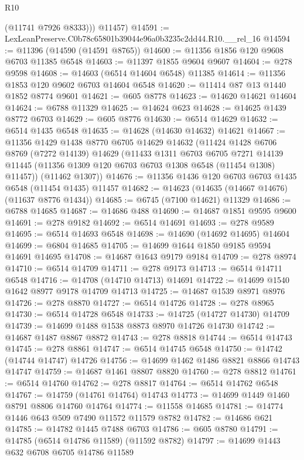 \begin{lexlean}{R10}
\begin{coremodule}
          (@11741 @7926 @8333)))
      @11457)
@14591 := LexLeanPreserve.C0b78c65801b39044e96a0b3235c2dd44.R10.__rel_16
@14594 := @11396 (@14590 (@14591 @8765))
@14600 := @11356 @1856 @120 @9608 @6703 @11385 @6548
@14603 := @11397 @1855 @9604 @9607
@14604 := @278 @9598
@14608 := @14603 (@6514 @14604 @6548) @11385
@14614 := @11356 @1853 @120 @9602 @6703 @14604 @6548
@14620 := @11414 @87 @13 @1440 @1852 @8774 @9601
@14621 := @605 @8778
@14623 := @14620 @14621 @14604
@14624 := @6788 @11329
@14625 := @14624 @623
@14628 := @14625 @1439 @8772 @6703
@14629 := @605 @8776
@14630 := @6514 @14629
@14632 := @6514 @1435 @6548
@14635 := @14628 (@14630 @14632) @14621
@14667 := @11356
    @1429
    @1438
    @8770
    @6705
    @14629
    @14632
    (@11424
      @1428
      @6706
      @8769
      (@7272 @14139)
      @14629
      (@11433
        @1311
        @6703
        @6705
        @7271
        @14139
        @11445
        (@11356 @1309 @120 @6703 @6703 @1308 @6548 (@11454 @1308) @11457))
      (@11462 @1307))
@14676 := @11356 @1436 @120 @6703 @6703 @1435 @6548 (@11454 @1435) @11457
@14682 := @14623 (@14635 (@14667 @14676) (@11637 @8776 @1434))
@14685 := @6745 (@7100 @14621) @11329
@14686 := @6788 @14685
@14687 := @14686 @488
@14690 := @14687 @1851 @9595 @9600
@14691 := @278 @9182
@14692 := @6514 @14691
@14693 := @278 @9589
@14695 := @6514 @14693 @6548
@14698 := @14690 (@14692 @14695) @14604
@14699 := @6804 @14685
@14705 := @14699 @1644 @1850 @9185 @9594 @14691 @14695
@14708 := @14687 @1643 @9179 @9184
@14709 := @278 @8974
@14710 := @6514 @14709
@14711 := @278 @9173
@14713 := @6514 @14711 @6548
@14716 := @14708 (@14710 @14713) @14691
@14722 := @14699 @1540 @1642 @8977 @9178 @14709 @14713
@14725 := @14687 @1539 @8971 @8976
@14726 := @278 @8870
@14727 := @6514 @14726
@14728 := @278 @8965
@14730 := @6514 @14728 @6548
@14733 := @14725 (@14727 @14730) @14709
@14739 := @14699 @1488 @1538 @8873 @8970 @14726 @14730
@14742 := @14687 @1487 @8867 @8872
@14743 := @278 @8818
@14744 := @6514 @14743
@14745 := @278 @8861
@14747 := @6514 @14745 @6548
@14750 := @14742 (@14744 @14747) @14726
@14756 := @14699 @1462 @1486 @8821 @8866 @14743 @14747
@14759 := @14687 @1461 @8807 @8820
@14760 := @278 @8812
@14761 := @6514 @14760
@14762 := @278 @8817
@14764 := @6514 @14762 @6548
@14767 := @14759 (@14761 @14764) @14743
@14773 := @14699 @1449 @1460 @8791 @8806 @14760 @14764
@14774 := @11558 @14685
@14781 := @14774 @1446 @643 @509 @7490 @11572 @11579 @8782
@14782 := @14686 @621
@14785 := @14782 @1445 @7488 @6703
@14786 := @605 @8780
@14791 := @14785 (@6514 @14786 @11589) (@11592 @8782)
@14797 := @14699 @1443 @632 @6708 @6705 @14786 @11589

\end{coremodule}
\end{lexlean}
